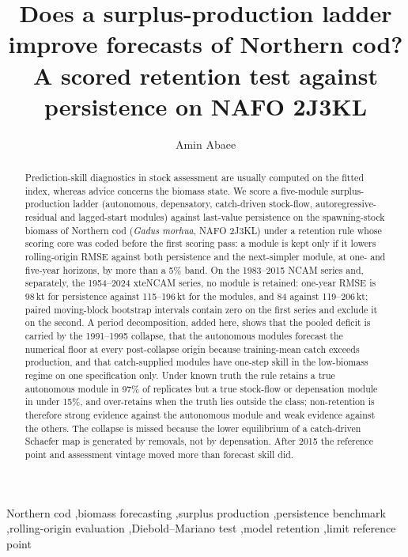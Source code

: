 \documentclass[preprint,11pt,authoryear]{elsarticle}
\theoremstyle{definition}
\theoremstyle{remark}
\begin{document}
\begin{frontmatter}

\title{Does a surplus-production ladder improve forecasts of Northern cod? A scored retention test against persistence on NAFO 2J3KL}

\author[1]{Amin Abaee}

\begin{abstract}
Prediction-skill diagnostics in stock assessment are usually computed on the fitted index, whereas advice concerns the biomass state. We score a five-module surplus-production ladder (autonomous, depensatory, catch-driven stock-flow, autoregressive-residual and lagged-start modules) against last-value persistence on the spawning-stock biomass of Northern cod (\emph{Gadus morhua}, NAFO 2J3KL) under a retention rule whose scoring core was coded before the first scoring pass: a module is kept only if it lowers rolling-origin RMSE against both persistence and the next-simpler module, at one- and five-year horizons, by more than a 5\% band. On the 1983--2015 NCAM series and, separately, the 1954--2024 xteNCAM series, no module is retained: one-year RMSE is 98\,kt for persistence against 115--196\,kt for the modules, and 84 against 119--206\,kt; paired moving-block bootstrap intervals contain zero on the first series and exclude it on the second. A period decomposition, added here, shows that the pooled deficit is carried by the 1991--1995 collapse, that the autonomous modules forecast the numerical floor at every post-collapse origin because training-mean catch exceeds production, and that catch-supplied modules have one-step skill in the low-biomass regime on one specification only. Under known truth the rule retains a true autonomous module in 97\% of replicates but a true stock-flow or depensation module in under 15\%, and over-retains when the truth lies outside the class; non-retention is therefore strong evidence against the autonomous module and weak evidence against the others. The collapse is missed because the lower equilibrium of a catch-driven Schaefer map is generated by removals, not by depensation. After 2015 the reference point and assessment vintage moved more than forecast skill did.
\end{abstract}

\begin{keyword}
Northern cod \sep biomass forecasting \sep surplus production \sep persistence benchmark \sep rolling-origin evaluation \sep Diebold--Mariano test \sep model retention \sep limit reference point
\end{keyword}

\end{frontmatter}
\end{document}
